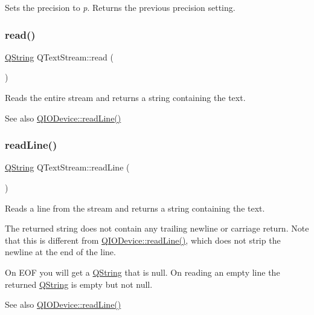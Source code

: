 Sets the precision to {\itshape p}. Returns the previous precision setting. \mbox{\label{class_q_text_stream_a1c74ba05c6e63e88303852e07dbbcaa3}} 
\subsubsection{\texorpdfstring{read()}{read()}}
{\footnotesize\ttfamily \mbox{\hyperlink{class_q_string}{Q\+String}} Q\+Text\+Stream\+::read (\begin{DoxyParamCaption}{ }\end{DoxyParamCaption})}

Reads the entire stream and returns a string containing the text.

\begin{DoxySeeAlso}{See also}
\mbox{\hyperlink{class_q_i_o_device_a4dc865ffcb5b7896ff8f9a1d828e4c0e}{Q\+I\+O\+Device\+::read\+Line()}} 
\end{DoxySeeAlso}
\mbox{\label{class_q_text_stream_a0bed0242d7c3f17289df88fdecad6afa}} 
\subsubsection{\texorpdfstring{readLine()}{readLine()}}
{\footnotesize\ttfamily \mbox{\hyperlink{class_q_string}{Q\+String}} Q\+Text\+Stream\+::read\+Line (\begin{DoxyParamCaption}{ }\end{DoxyParamCaption})}

Reads a line from the stream and returns a string containing the text.

The returned string does not contain any trailing newline or carriage return. Note that this is different from \mbox{\hyperlink{class_q_i_o_device_a4dc865ffcb5b7896ff8f9a1d828e4c0e}{Q\+I\+O\+Device\+::read\+Line()}}, which does not strip the newline at the end of the line.

On E\+OF you will get a \mbox{\hyperlink{class_q_string}{Q\+String}} that is null. On reading an empty line the returned \mbox{\hyperlink{class_q_string}{Q\+String}} is empty but not null.

\begin{DoxySeeAlso}{See also}
\mbox{\hyperlink{class_q_i_o_device_a4dc865ffcb5b7896ff8f9a1d828e4c0e}{Q\+I\+O\+Device\+::read\+Line()}} 
\end{DoxySeeAlso}
\mbox{\label{class_q_text_stream_a5320c9f2058d72a264aa2152cc69852e}} 
